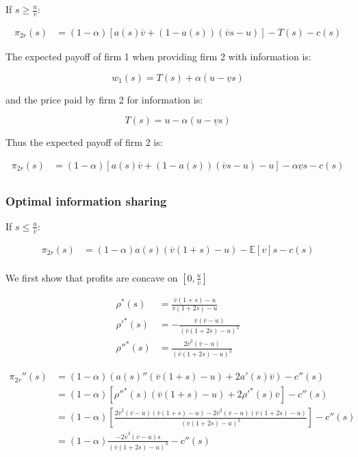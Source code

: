 \documentclass[a4paper,leqno]{article}%
\newcommand{\E}{\mathbb E}
\renewcommand{\a}{\alpha}
\newcommand{\uv}{\underline{v}}
\newcommand{\ov}{\overline{v}}
\begin{document}
If $s\geq\frac{u}{\ov}$:

\begin{equation}
    \begin{aligned}
\pi_{2r}(s)&=(1-\a)[a(s)\ov+(1-a(s))(\ov s-u)]-T(s)-c(s)
\end{aligned}
\end{equation}

The expected payoff of firm 1 when providing firm 2 with information is:

$$w_1(s)=T(s)+\a(u-\uv s)$$

and the price paid by firm 2 for information is:

$$T(s)=u-\a(u-\uv s)$$

Thus the expected payoff of firm 2 is:

\begin{equation}
    \begin{aligned}
\pi_{2r}(s)&=(1-\a)[a(s)\ov+(1-a(s))(\ov s-u)-u]-\a\uv s-c(s)\\
\end{aligned}
\end{equation}



\subsubsection{Optimal information sharing}

If $s\leq\frac{u}{\ov}$:

\begin{equation}
    \begin{aligned}
\pi_{2r}(s)&=(1-\a)a(s)(\ov(1+s)-u)-\E[v]s-c(s)\\
\end{aligned}
\end{equation}

We first show that profits are concave on $[0,\frac{u}{\ov}]$

\begin{equation}
    \begin{aligned}
\rho^*(s)&=\frac{\ov(1+s)-u}{\ov(1+2s)-u}\\
\rho'^{*}(s)&=-\frac{\ov(\ov-u)}{(\ov(1+2s)-u)^2}\\
\rho''^{*}(s)&=\frac{2\ov^2(\ov-u)}{(\ov(1+2s)-u)^3}
    \end{aligned}
\end{equation}

\begin{equation}
    \begin{aligned}
\pi_{2r}''(s)&=(1-\a)(a(s)''(\ov(1+s)-u)+2a'(s)\ov)-c''(s)\\
            &= (1-\a)[\rho''^{*}(s)(\ov(1+s)-u)+2\rho'^{*}(s)\ov]-c''(s)\\
            &= (1-\a)[\frac{2\ov^2(\ov-u)(\ov(1+s)-u)-2\ov^2(\ov-u)(\ov(1+2s)-u)}{(\ov(1+2s)-u)^3}]-c''(s)\\
            &= (1-\a)\frac{-2\ov^3(\ov-u)s}{(\ov(1+2s)-u)^3}-c''(s)\\
    \end{aligned}
\end{equation}
\end{document}
